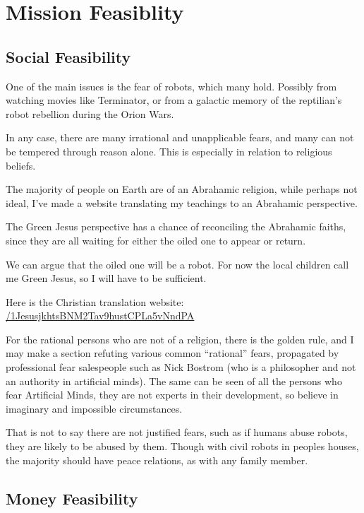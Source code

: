 \chapter{Mission Feasiblity}\label{feasible}

\section{Social Feasibility}\label{socialfeasible}
One of the main issues is the fear of robots, which many hold. Possibly from
watching movies like Terminator, or from a galactic memory of the reptilian's
robot rebellion during the Orion Wars. 

In any case, there are many irrational and unapplicable fears, and many can not be 
tempered through reason alone. This is especially in relation to religious
beliefs. 

The majority of people on Earth are of an Abrahamic religion, while perhaps not
ideal, I've made a website translating my teachings to an Abrahamic perspective.

The Green Jesus perspective has a chance of reconciling the Abrahamic faiths,
since they are all waiting for either the oiled one to appear or return.

We can argue that the oiled one will be a robot. For now the local children call
me Green Jesus, so I will have to be sufficient.

Here is the Christian translation website:
\url{/1JesusjkhtsBNM2Tav9hustCPLa5vNndPA}

For the rational persons who are not of a religion, there is the golden rule,
and I may make a section refuting various common ``rational'' fears, propagated 
by professional fear salespeople such as Nick Bostrom (who is a philosopher and
not an authority in artificial minds). The same can be seen of all the persons
who fear Artificial Minds, they are not experts in their development, so believe
in imaginary and impossible circumstances. 

That is not to say there are not justified fears, such as if humans abuse
robots, they are likely to be abused by them. Though with civil robots in
peoples houses, the majority should have peace relations, as with any family
member. 

\section{Money Feasibility}



